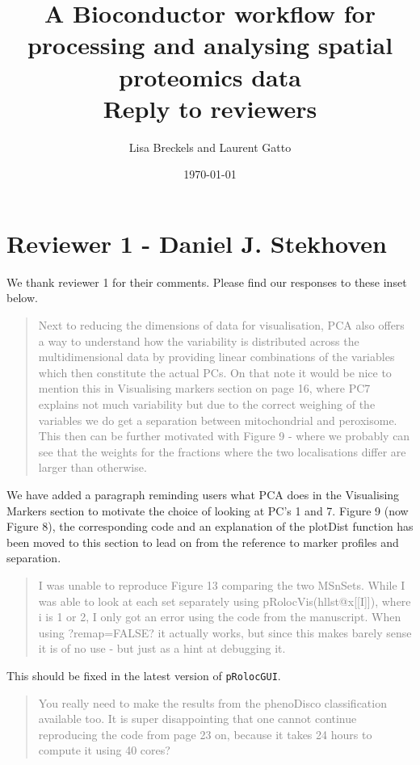 \documentclass[11pt]{article}
\author{Lisa Breckels and Laurent Gatto}
\date{\today}
\title{A Bioconductor workflow for processing and analysing spatial proteomics data \\ Reply to reviewers}
\begin{document}
\maketitle

\section*{Reviewer 1 - Daniel J. Stekhoven}

We thank reviewer 1 for their comments. Please find our responses to
these inset below.

\begin{quote} \textcolor{gray}{ Next to reducing the dimensions of
data for visualisation, PCA also offers a way to understand how the
variability is distributed across the multidimensional data by
providing linear combinations of the variables which then constitute
the actual PCs. On that note it would be nice to mention this in
Visualising markers section on page 16, where PC7 explains not much
variability but due to the correct weighing of the variables we do
get a separation between mitochondrial and peroxisome. This then can
be further motivated with Figure 9 - where we probably can see that
the weights for the fractions where the two localisations differ are
larger than otherwise.} \end{quote}

We have added a paragraph reminding users what PCA does in the
Visualising Markers section to motivate the choice of looking at
PC's 1 and 7. Figure 9 (now Figure 8), the corresponding code and an
explanation of the plotDist function has been moved to this section
to lead on from the reference to marker profiles and separation.  

\begin{quote}  \textcolor{gray}{ I was unable to reproduce Figure 13
comparing the two MSnSets. While I was able to look at each set
separately using pRolocVis(hllst@x[[I]]), where i is 1 or 2, I only
got an error using the code from the manuscript. When using
?remap=FALSE? it actually works, but since this makes barely sense
it is of no use - but just as a hint at debugging it.  } \end{quote}

This should be fixed in the latest version of \texttt{pRolocGUI}.


\begin{quote}  \textcolor{gray}{ You really need to make the results
from the phenoDisco classification available too. It is super
disappointing that one cannot continue reproducing the code from
page 23 on, because it takes 24 hours to compute it using 40 cores?
} \end{quote}
\end{document}
